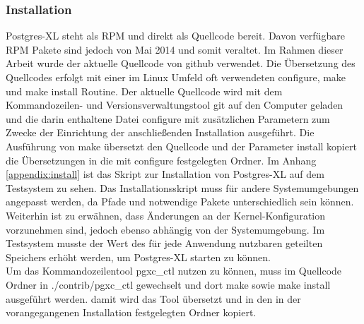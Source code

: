 \subsubsection{Installation}
Postgres-XL steht als RPM und direkt als Quellcode bereit.
Davon verfügbare RPM Pakete sind jedoch von Mai 2014 und somit veraltet.
Im Rahmen dieser Arbeit wurde der aktuelle Quellcode von github verwendet.
Die Übersetzung des Quellcodes erfolgt mit einer im Linux Umfeld oft verwendeten configure, make und make install Routine.
Der aktuelle Quellcode wird mit dem Kommandozeilen- und Versionsverwaltungstool git auf den Computer geladen und die darin enthaltene Datei configure mit zusätzlichen Parametern zum Zwecke der Einrichtung der anschließenden Installation ausgeführt.
Die Ausführung von make übersetzt den Quellcode und der Parameter install kopiert die Übersetzungen in die mit configure festgelegten Ordner.
Im Anhang \ref{appendix:install} ist das Skript zur Installation von Postgres-XL auf dem Testsystem zu sehen.
Das Installationsskript muss für andere Systemumgebungen angepasst werden, da Pfade und notwendige Pakete unterschiedlich sein können.
Weiterhin ist zu erwähnen, dass Änderungen an der Kernel-Konfiguration vorzunehmen  sind, jedoch ebenso abhängig von der Systemumgebung.
Im Testsystem musste der Wert des für jede Anwendung nutzbaren geteilten Speichers erhöht werden, um Postgres-XL starten zu können.\\
Um das Kommandozeilentool pgxc\_{}ctl nutzen zu können, muss im Quellcode Ordner in ./contrib/pgxc\_{}ctl gewechselt und dort make sowie make install ausgeführt werden. damit wird das Tool übersetzt und in den in der vorangegangenen Installation festgelegten Ordner kopiert.

